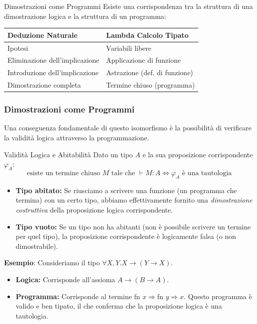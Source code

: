 \documentclass[a4paper,11pt]{report}
\begin{document}
\begin{defframe}{Dimostrazioni come Programmi}{}
    Esiste una corrispondenza tra la struttura di una dimostrazione logica e la struttura di un programma:
    
    \begin{center}
    \begin{tabular}{|l|l|}
        \hline
        \textbf{Deduzione Naturale} & \textbf{Lambda Calcolo Tipato} \\
        \hline
        Ipotesi & Variabili libere \\
        Eliminazione dell'implicazione & Applicazione di funzione \\
        Introduzione dell'implicazione & Astrazione (def. di funzione) \\
        Dimostrazione completa & Termine chiuso (programma) \\
        \hline
    \end{tabular}
    \end{center}
\end{defframe}


\subsubsection{Dimostrazioni come Programmi}

Una conseguenza fondamentale di questo isomorfismo è la possibilità di verificare la validità logica attraverso la programmazione.

\begin{gframe}{Validità Logica e Abitabilità}
    Dato un tipo \( A \) e la sua proposizione corrispondente \( \varphi_A \):
    \[ \text{esiste un termine chiuso } M \text{ tale che } \vdash M : A \iff \varphi_A \text{ è una tautologia} \]
    
    \begin{itemize}
        \item \textbf{Tipo abitato:} Se riusciamo a scrivere una funzione (un programma che termina) con un certo tipo, abbiamo effettivamente fornito una \textit{dimostrazione costruttiva} della proposizione logica corrispondente.
        \item \textbf{Tipo vuoto:} Se un tipo non ha abitanti (non è possibile scrivere un termine per quel tipo), la proposizione corrispondente è logicamente falsa (o non dimostrabile).
    \end{itemize}
\end{gframe}

\textbf{Esempio}:
Consideriamo il tipo \( \forall X, Y. X \to (Y \to X) \).
\begin{itemize}
    \item \textbf{Logica:} Corrisponde all'assioma \( A \to (B \to A) \).
    \item \textbf{Programma:} Corrisponde al termine \( \text{fn } x \Rightarrow \text{fn } y \Rightarrow x \). Questo programma è valido e ben tipato, il che conferma che la proposizione logica è una tautologia.
\end{itemize}
\end{document}
